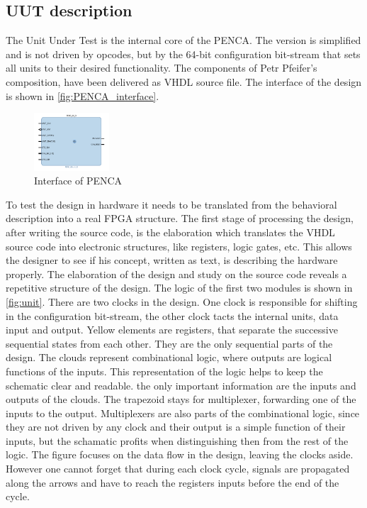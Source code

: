 \subsection{UUT description}
The Unit Under Test is the internal core of the PENCA. The version is simplified and is not driven by opcodes, but by the 64-bit configuration bit-stream that sets all units to their desired functionality.
The components of Petr Pfeifer's composition, have been delivered as VHDL source file. The interface of the design is shown in \autoref{fig:PENCA_interface}.

\begin{figure}[h]
\centering
\includegraphics[width=0.25\textwidth]{figures/PENCA_interface.PNG}
\caption{Interface of PENCA}
\label{fig:PENCA_interface}
\end{figure}

To test the design in hardware it needs to be translated from the behavioral description into a real FPGA structure. The first stage of processing the design, after writing the source code, is the elaboration which translates the VHDL source code into electronic structures, like registers, logic gates, etc. This allows the designer to see if his concept, written as text, is describing the hardware properly.
The elaboration of the design and study on the source code reveals a repetitive structure of the design. The logic of the first two modules is shown in \autoref{fig:unit}. There are two clocks in the design. One clock is responsible for shifting in the configuration bit-stream, the other clock tacts the internal units, data input and output. Yellow elements are registers, that separate the successive sequential states from each other. They are the only sequential parts of the design. The clouds represent combinational logic, where outputs are logical functions of the inputs. This representation of the logic helps to keep the schematic clear and readable. the only important information are the inputs and outputs of the clouds. The trapezoid stays for multiplexer, forwarding one of the inputs to the output. Multiplexers are also parts of the combinational logic, since they are not driven by any clock and their output is a simple function of their inputs, but the schamatic profits when distinguishing then from the rest of the logic. The figure focuses on the data flow in the design, leaving the clocks aside. However one cannot forget that during each clock cycle, signals are propagated along the arrows and have to reach the registers inputs before the end of the cycle.

